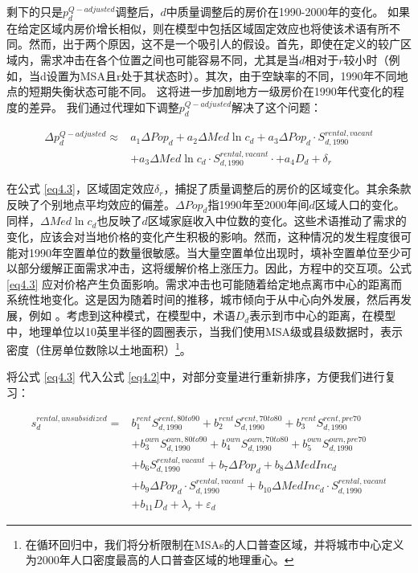 \documentclass[lang=cn,11pt,a4paper]{paper}
\begin{document}
剩下的只是$p_{d}^{Q-adjusted}$调整后，$d$中质量调整后的房价在1990-2000年的变化。 如果在给定区域内房价增长相似，则在模型中包括区域固定效应也将使该术语有所不同。然而，出于两个原因，这不是一个吸引人的假设。首先，即使在定义的较广区域内，需求冲击在各个位置之间也可能容易不同，尤其是当$d$相对于$r$较小时（例如，当d设置为MSA且r处于其状态时）。其次，由于空缺率的不同，1990年不同地点的短期失衡状态可能不同。 这将进一步加剧地方一级房价在1990年代变化的程度的差异。 我们通过代理如下调整$p_{d}^{Q-adjusted}$解决了这个问题：

\begin{equation}\label{eq4.3}
  \begin{aligned}
    \Delta p_{d}^{Q-adjusted} \approx & a_{1} \Delta Pop_{d}+a_{2} \Delta Med \ln c_{d}+a_{3} \Delta P o p_{d} \cdot S_{d, 1990}^{rental,vacant} \\
    &+a_{3} \Delta M e d \ln c_{d} \cdot S_{d, 1990}^{rental,vacant} \cdot+a_{4} D_{d}+\delta_{r}
    \end{aligned}
\end{equation}
\vspace{3pt}

在公式 \eqref{eq4.3}，区域固定效应$\delta_{r}$，捕捉了质量调整后的房价的区域变化。其余条款反映了个别地点平均效应的偏差。$\Delta Pop_{d}$指1990年至2000年间$d$区域人口的变化。同样，$\Delta Med \ln c_{d}$也反映了$d$区域家庭收入中位数的变化。这些术语推动了需求的变化，应该会对当地价格的变化产生积极的影响。然而，这种情况的发生程度很可能对1990年空置单位的数量很敏感。当大量空置单位出现时，填补空置单位至少可以部分缓解正面需求冲击，这将缓解价格上涨压力。因此，方程中的交互项。公式 \eqref{eq4.3} 应对价格产生负面影响。需求冲击也可能随着给定地点离市中心的距离而系统性地变化。这是因为随着时间的推移，城市倾向于从中心向外发展，然后再发展，例如 \cite{Brueckner2009725}。考虑到这种模式，在模型中，术语$D_d$表示到市中心的距离，在模型中，地理单位以10英里半径的圆圈表示，当我们使用MSA级或县级数据时，表示密度（住房单位数除以土地面积）\!\footnote{在循环回归中，我们将分析限制在MSAs的人口普查区域，并将城市中心定义为2000年人口密度最高的人口普查区域的地理重心。}。

将公式 \eqref{eq4.3} 代入公式 \eqref{eq4.2}中，对部分变量进行重新排序，方便我们进行复习：

\begin{equation}\label{eq4.4}
  \begin{aligned}
    s_{d}^{rental, unsubsidized}=& b_{1}^{rent} S_{d, 1990}^{rent, 80 t o 90}+b_{2}^{rent} S_{d, 1990}^{rent, 70 t o 80}+b_{3}^{rent} S_{d, 1990}^{rent, p r e 70} \\
    &+b_{3}^{own} S_{d, 1990}^{own, 80 t o 90}+b_{4}^{own} S_{d, 1990}^{own, 70 t o 80}+b_{5}^{own} S_{d, 1990}^{own, p r e 70} \\
    &+b_{6} S_{d, 1990}^{rent a l, vacant}+b_{7} \Delta P o p_{d}+b_{8} \Delta MedInc_{d} \\
    &+b_{9} \Delta Po p_{d} \cdot S_{d, 1990}^{rental, vacant}+b_{10} \Delta MedInc_{d} \cdot S_{d, 1990}^{rent a l, vacant} \\
    &+b_{11} D_{d}+\lambda_{r}+\varepsilon_{d}
    \end{aligned}
\end{equation}
\vspace{3pt}
\end{document}
